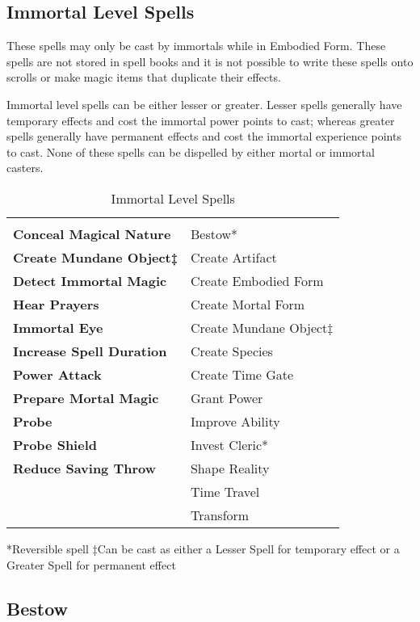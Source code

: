 \begin{multicols*}{2}
\section{Immortal Level Spells}\label{sec:Immortal Level Spells}
These spells may only be cast by immortals while in Embodied Form. These spells are not stored in spell books and it is not possible to write these spells onto scrolls or make magic items that duplicate their effects.

Immortal level spells can be either lesser or greater. Lesser spells generally have temporary effects and cost the immortal power points to cast; whereas greater spells generally have permanent effects and cost the immortal experience points to cast. None of these spells can be dispelled by either mortal or immortal casters.

\begin {table}[H]
  \caption{Immortal Level Spells}
  \begin{tabularx}{\columnwidth}{>{\bfseries}YY}
	 & \\
	Conceal Magical Nature & Bestow*\\
	Create Mundane Object‡ & Create Artifact\\
	Detect Immortal Magic & Create Embodied Form\\
	Hear Prayers & Create Mortal Form\\
	Immortal Eye & Create Mundane Object‡\\
	Increase Spell Duration & Create Species\\
	Power Attack & Create Time Gate\\
	Prepare Mortal Magic & Grant Power\\
	Probe & Improve Ability\\
	Probe Shield & Invest Cleric*\\
	Reduce Saving Throw & Shape Reality\\
	& Time Travel\\
	& Transform
	\end {tabularx}
	*Reversible spell
	‡Can be cast as either a Lesser Spell for temporary effect or a Greater Spell for permanent effect
\end {table}

\subsection{Bestow}
\end{multicols*}
